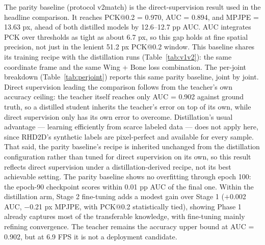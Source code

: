 \documentclass[11pt,conference,a4paper]{APSIPA2026}
\begin{document}
The parity baseline (protocol v2match) is the direct-supervision result used in the headline comparison. It reaches PCK@0.2 = 0.970, AUC = 0.894, and MPJPE = 13.63 px, ahead of both distilled models by 12.6–12.7 pp AUC. AUC integrates PCK over thresholds as tight as about 6.7 px, so this gap holds at fine spatial precision, not just in the lenient 51.2 px PCK@0.2 window. This baseline shares its training recipe with the distillation runs (Table~\ref{tab:v1v2}): the same coordinate frame and the same Wing + Bone loss combination. The per-joint breakdown (Table~\ref{tab:perjoint}) reports this same parity baseline, joint by joint. Direct supervision leading the comparison follows from the teacher's own accuracy ceiling: the teacher itself reaches only AUC = 0.902 against ground truth, so a distilled student inherits the teacher's error on top of its own, while direct supervision only has its own error to overcome. Distillation's usual advantage — learning efficiently from scarce labeled data — does not apply here, since RHD2D's synthetic labels are pixel-perfect and available for every sample. That said, the parity baseline's recipe is inherited unchanged from the distillation configuration rather than tuned for direct supervision on its own, so this result reflects direct supervision under a distillation-derived recipe, not its best achievable setting. The parity baseline shows no overfitting through epoch 100: the epoch-90 checkpoint scores within 0.01 pp AUC of the final one. Within the distillation arm, Stage 2 fine-tuning adds a modest gain over Stage 1 ($+$0.002 AUC, $-$0.21 px MPJPE, with PCK@0.2 statistically tied), showing Phase 1 already captures most of the transferable knowledge, with fine-tuning mainly refining convergence. The teacher remains the accuracy upper bound at AUC = 0.902, but at 6.9 FPS it is not a deployment candidate.
\end{document}
